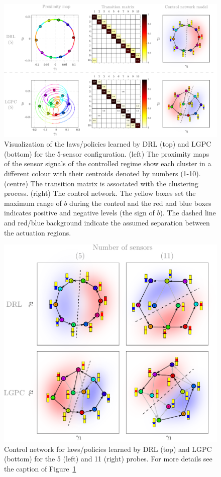 \begin{figure}[t]
    \centering
    \includegraphics[width=0.95\linewidth]{Figures/8.pdf}
    \caption{Visualization of the laws/policies learned by DRL (top) and LGPC (bottom) for the 5-sensor configuration. (left) The proximity maps of the sensor signals of the controlled regime show each cluster in a different colour with their centroids denoted by numbers (1-10). (centre) The transition matrix is associated with the clustering process. (right) The control network. The yellow boxes set the maximum range of $b$ during the control and the red and blue boxes indicates positive and negative levels (the sign of $b$). The dashed line and red/blue background indicate the assumed separation between the actuation regions.} \label{fig:CL_S5}
\end{figure}
%
\begin{figure}[h!]
    \centering
    \includegraphics[width=0.7\linewidth]{Figures/9.pdf}
    \caption{Control network for laws/policies learned by DRL (top) and LGPC (bottom) for the 5 (left) and 11 (right) probes. For more details see the caption of Figure~\ref{fig:CL_S5}}
    \label{fig:CL_S}
\end{figure}

